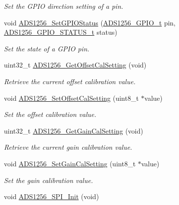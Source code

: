 \begin{DoxyCompactItemize}
\begin{DoxyCompactList}\small\item\em Set the G\-P\-I\-O direction setting of a pin. \end{DoxyCompactList}\item 
void \hyperlink{group__ads1256__driver_ga3285b54e967fbb817f071f9a1c455920}{A\-D\-S1256\-\_\-\-Set\-G\-P\-I\-O\-Status} (\hyperlink{group__ads1256__driver_gaf55f2ff09e67223f3e5e0a6eb69de98b}{A\-D\-S1256\-\_\-\-G\-P\-I\-O\-\_\-t} pin, \hyperlink{group__ads1256__driver_ga587084017ba4b239ffb8d90376921c2c}{A\-D\-S1256\-\_\-\-G\-P\-I\-O\-\_\-\-S\-T\-A\-T\-U\-S\-\_\-t} status)
\begin{DoxyCompactList}\small\item\em Set the state of a G\-P\-I\-O pin. \end{DoxyCompactList}\item 
uint32\-\_\-t \hyperlink{group__ads1256__driver_ga63ad5ddbb824fd07aedb6c0884db47eb}{A\-D\-S1256\-\_\-\-Get\-Offset\-Cal\-Setting} (void)
\begin{DoxyCompactList}\small\item\em Retrieve the current offset calibration value. \end{DoxyCompactList}\item 
void \hyperlink{group__ads1256__driver_ga420b194968282731c912be5ccad0d30c}{A\-D\-S1256\-\_\-\-Set\-Offset\-Cal\-Setting} (uint8\-\_\-t $\ast$value)
\begin{DoxyCompactList}\small\item\em Set the offset calibration value. \end{DoxyCompactList}\item 
uint32\-\_\-t \hyperlink{group__ads1256__driver_ga06c5d4c98c45514224e4f494b2618221}{A\-D\-S1256\-\_\-\-Get\-Gain\-Cal\-Setting} (void)
\begin{DoxyCompactList}\small\item\em Retrieve the current gain calibration value. \end{DoxyCompactList}\item 
void \hyperlink{group__ads1256__driver_ga87d92ada1f9826aabe9e4b330e9edbef}{A\-D\-S1256\-\_\-\-Set\-Gain\-Cal\-Setting} (uint8\-\_\-t $\ast$value)
\begin{DoxyCompactList}\small\item\em Set the gain calibration value. \end{DoxyCompactList}\item 
void \hyperlink{group__ads1256__driver_gaf09ce69ea32ea967d008d0a465929820}{A\-D\-S1256\-\_\-\-S\-P\-I\-\_\-\-Init} (void)

\end{DoxyCompactItemize}
